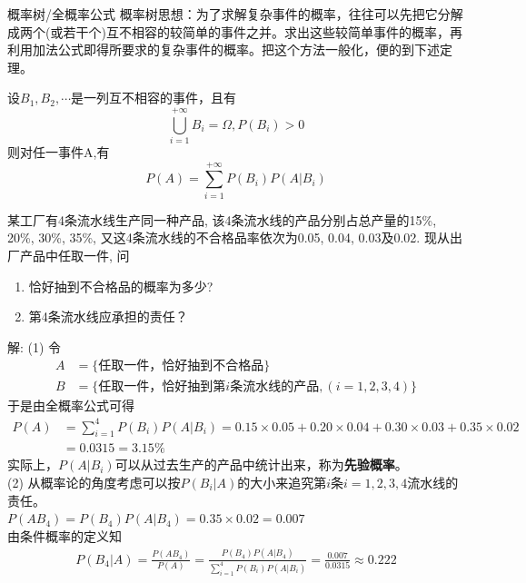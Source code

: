 \begin{frame}{概率树/全概率公式}
概率树思想：为了求解复杂事件的概率，往往可以先把它分解成两个(或若干个)互不相容的较简单的事件之并。求出这些较简单事件的概率，再利用加法公式即得所要求的复杂事件的概率。把这个方法一般化，便的到下述定理。
\begin{theorem}
	设$B_1,B_2,\cdots$是一列互不相容的事件，且有
	\[\bigcup_{i=1}^{+\infty}B_i=\Omega,P(B_i)>0 \]
	则对任一事件A,有
	\[P(A)=\sum_{i=1}^{+\infty}P(B_i)P(A|B_i) \]	
\end{theorem}
\end{frame}

\begin{frame}
\begin{example}
	某工厂有4条流水线生产同一种产品, 该4条流水线的产品分别占总产量的15\%, 20\%, 30\%, 35\%, 又这4条流水线的不合格品率依次为0.05, 0.04, 0.03及0.02. 现从出厂产品中任取一件, 问
	\begin{enumerate}
		\item 恰好抽到不合格品的概率为多少? 
		\item 第4条流水线应承担的责任？
	\end{enumerate} 
\end{example}
\end{frame}

\begin{frame}[shrink]
解: (1) 令
\begin{align*}
A&=\{\text{任取一件，恰好抽到不合格品} \}\\
B&=\{\text{任取一件，恰好抽到第$i$条流水线的产品}, (i=1,2,3,4) \}
\end{align*}
于是由全概率公式可得
\begin{align*}
P(A)&=\sum\limits_{i=1}^4P(B_i)P(A|B_i)=0.15\times 0.05+0.20\times 0.04+0.30\times 0.03+0.35\times 0.02\\
&=0.0315=3.15\%
\end{align*}
实际上，$P(A|B_i)$可以从过去生产的产品中统计出来，称为\textbf{先验概率}。\\
(2) 从概率论的角度考虑可以按$P(B_i|A)$的大小来追究第$i$条$i=1,2,3,4$流水线的责任。\\
$P(AB_4)=P(B_4)P(A|B_4)=0.35\times 0.02=0.007$\\
由条件概率的定义知
\begin{align*}
P(B_4|A)=\frac{P(AB_4)}{P(A)}=\frac{P(B_4)P(A|B_4)}{\sum\limits_{i=1}^4P(B_i)P(A|B_i)}=\frac{0.007}{0.0315}\approx 0.222
\end{align*}
\end{frame}

